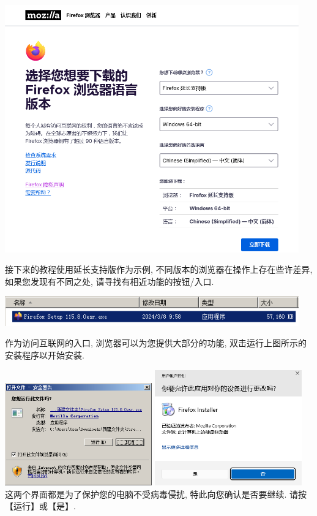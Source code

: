 \includegraphics[width=5in]{media/image2.png}

接下来的教程使用延长支持版作为示例, 不同版本的浏览器在操作上存在些许差异, 如果您发现有不同之处, 请寻找有相近功能的按钮/入口. 

\includegraphics[width=5in]{media/image3.png}

作为访问互联网的入口, 浏览器可以为您提供大部分的功能, 双击运行上图所示的安装程序以开始安装. 

\includegraphics[width=2.5in]{media/image4.png}
\includegraphics[width=2.5in]{media/windows-uac-dialog-win11.png} \\
这两个界面都是为了保护您的电脑不受病毒侵扰, 特此向您确认是否要继续. 请按【运行】或【是】. 

